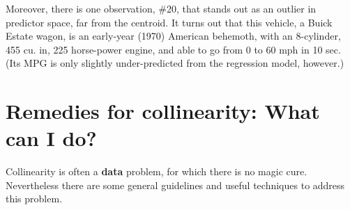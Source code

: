 \documentclass[
  letterpaper,
  10pt,
  krantz2]{krantz}
\begin{document}
Moreover, there is one observation, \#20, that stands out as an outlier
in predictor space, far from the centroid. It turns out that this
vehicle, a Buick Estate wagon, is an early-year (1970) American
behemoth, with an 8-cylinder, 455 cu. in, 225 horse-power engine, and
able to go from 0 to 60 mph in 10 sec. (Its MPG is only slightly
under-predicted from the regression model, however.)

\section{Remedies for collinearity: What can I do?}\label{sec-remedies}

Collinearity is often a \textbf{data} problem, for which there is no
magic cure. Nevertheless there are some general guidelines and useful
techniques to address this problem.
\end{document}
